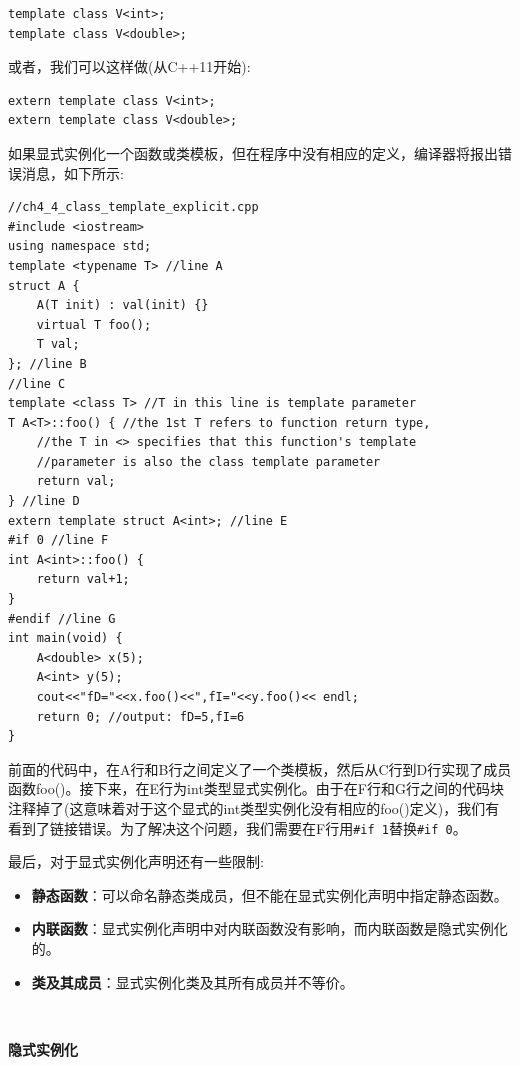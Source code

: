 \begin{lstlisting}[caption={}]
template class V<int>;
template class V<double>;
\end{lstlisting}

或者，我们可以这样做(从C++11开始): \par

\begin{lstlisting}[caption={}]
extern template class V<int>;
extern template class V<double>;
\end{lstlisting}

如果显式实例化一个函数或类模板，但在程序中没有相应的定义，编译器将报出错误消息，如下所示: \par

\begin{lstlisting}[caption={}]
//ch4_4_class_template_explicit.cpp
#include <iostream>
using namespace std;
template <typename T> //line A
struct A {
	A(T init) : val(init) {}
	virtual T foo();
	T val;
}; //line B
//line C
template <class T> //T in this line is template parameter
T A<T>::foo() { //the 1st T refers to function return type,
	//the T in <> specifies that this function's template
	//parameter is also the class template parameter
	return val;
} //line D
extern template struct A<int>; //line E
#if 0 //line F
int A<int>::foo() {
	return val+1;
}
#endif //line G
int main(void) {
	A<double> x(5);
	A<int> y(5);
	cout<<"fD="<<x.foo()<<",fI="<<y.foo()<< endl;
	return 0; //output: fD=5,fI=6
}
\end{lstlisting}

前面的代码中，在A行和B行之间定义了一个类模板，然后从C行到D行实现了成员函数foo()。接下来，在E行为int类型显式实例化。由于在F行和G行之间的代码块注释掉了(这意味着对于这个显式的int类型实例化没有相应的foo()定义)，我们有看到了链接错误。为了解决这个问题，我们需要在F行用\texttt{\#if 1}替换\texttt{\#if 0}。\par
最后，对于显式实例化声明还有一些限制: \par

\begin{itemize}
	\item \textbf{静态函数}：可以命名静态类成员，但不能在显式实例化声明中指定静态函数。
	\item \textbf{内联函数}：显式实例化声明中对内联函数没有影响，而内联函数是隐式实例化的。
	\item \textbf{类及其成员}：显式实例化类及其所有成员并不等价。
\end{itemize}

\noindent\textbf{}\ \par
\textbf{隐式实例化} \ \par


